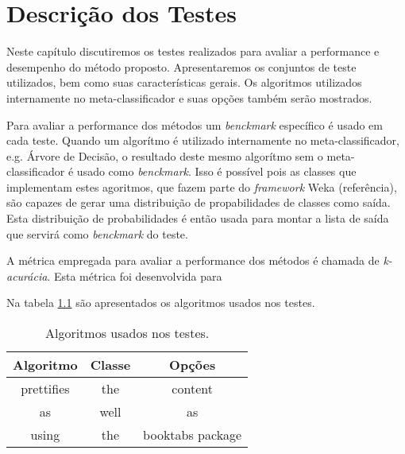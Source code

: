 \chapter{Descrição dos Testes}

Neste capítulo discutiremos os testes realizados para avaliar a performance e desempenho do método proposto.
Apresentaremos os conjuntos de teste utilizados, bem como suas características gerais. 
Os algoritmos utilizados internamente no meta-classificador e suas opções também serão mostrados.

Para avaliar a performance dos métodos um \textit{benckmark} específico é usado em cada teste.
Quando um algorítmo é utilizado internamente no meta-classificador, e.g. Árvore de Decisão, o resultado deste mesmo algorítmo sem o meta-classificador é usado como \textit{benckmark}.
Isso é possível pois as classes que implementam estes agoritmos, que fazem parte do \textit{framework} Weka (referência), são capazes de gerar uma distribuição de propabilidades de classes como saída.
Esta distribuição de probabilidades é então usada para montar a lista de saída que servirá como \textit{benckmark} do teste.

A métrica empregada para avaliar a performance dos métodos é chamada de \textit{k-acurácia}.
Esta métrica foi desenvolvida para 



Na tabela \ref{tab:algoritmostestes} são apresentados os algoritmos usados nos testes.

\begin{table}[h!]
  \begin{center}
    \caption{Algoritmos usados nos testes.}
    \label{tab:algoritmostestes}
    \begin{tabular}{ccc}
      \toprule
      Algoritmo & Classe & Opções\\
      \midrule
      prettifies & the & content\\
      as & well & as\\
      using & the & booktabs package\\
      \bottomrule
    \end{tabular}
  \end{center}
\end{table}




